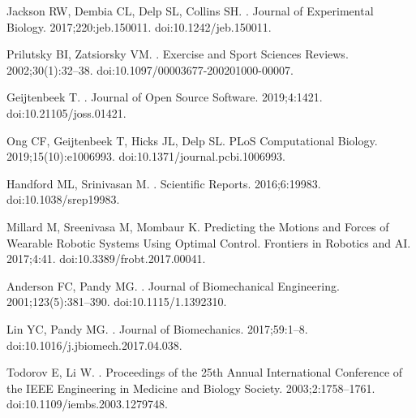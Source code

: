 \documentclass[10pt,letterpaper]{article}
\begin{document}
\begin{thebibliography}{10}
    Jackson RW, Dembia CL, Delp SL, Collins SH.
    .
    \newblock Journal of Experimental Biology. 2017;220:jeb.150011.
    \newblock doi:{10.1242/jeb.150011}.

    Prilutsky BI, Zatsiorsky VM.
    .
    \newblock Exercise and Sport Sciences Reviews. 2002;30(1):32--38.
    \newblock doi:{10.1097/00003677-200201000-00007}.

    Geijtenbeek T.
    .
    \newblock Journal of Open Source Software. 2019;4:1421.
    \newblock doi:{10.21105/joss.01421}.

    Ong CF, Geijtenbeek T, Hicks JL, Delp SL.
    \newblock PLoS Computational Biology. 2019;15(10):e1006993.
    \newblock doi:{10.1371/journal.pcbi.1006993}.

    Handford ML, Srinivasan M.
    .
    \newblock Scientific Reports. 2016;6:19983.
    \newblock doi:{10.1038/srep19983}.

    Millard M, Sreenivasa M, Mombaur K.
    \newblock Predicting the Motions and Forces of Wearable Robotic Systems Using
    Optimal Control.
    \newblock Frontiers in Robotics and AI. 2017;4:41.
    \newblock doi:{10.3389/frobt.2017.00041}.

    Anderson FC, Pandy MG.
    .
    \newblock Journal of Biomechanical Engineering. 2001;123(5):381--390.
    \newblock doi:{10.1115/1.1392310}.

    Lin YC, Pandy MG.
    .
    \newblock Journal of Biomechanics. 2017;59:1--8.
    \newblock doi:{10.1016/j.jbiomech.2017.04.038}.

    Todorov E, Li W.
    .
    \newblock Proceedings of the 25th Annual International Conference of the IEEE
    Engineering in Medicine and Biology Society. 2003;2:1758--1761.
    \newblock doi:{10.1109/iembs.2003.1279748}.


\end{thebibliography}
\end{document}
